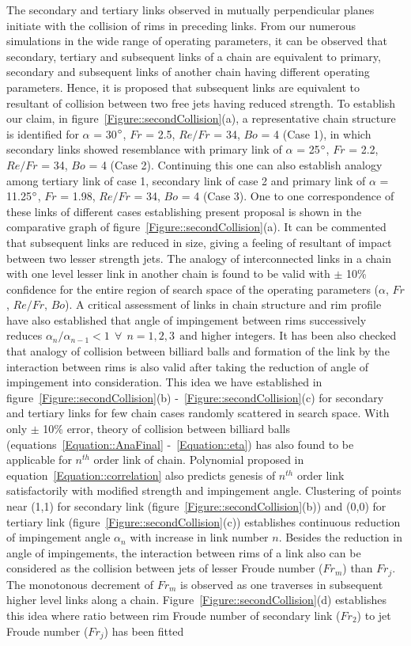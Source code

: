 \documentclass{jfm}
\begin{document}
The secondary and tertiary links observed in mutually perpendicular planes initiate with the collision of rims in preceding links. From our numerous simulations in the wide range of operating parameters, it can be observed that secondary, tertiary and subsequent links of a chain are equivalent to primary, secondary and subsequent links of another chain having different operating parameters. Hence, it is proposed that subsequent links are equivalent to resultant of collision between two free jets having reduced strength. To establish our claim, in figure~\ref{Figure::secondCollision}(a), a representative chain structure is identified for $\alpha$ = 30$\degree$, $Fr$ = 2.5, $Re/Fr$ = 34, $Bo$ = 4 (Case 1), in which secondary links showed resemblance with primary link of $\alpha$ = 25$\degree$, $Fr$ = 2.2, $Re/Fr$ = 34, $Bo$ = 4 (Case 2). Continuing this one can also establish analogy among tertiary link of case 1, secondary link of case 2 and primary link of $\alpha$ = 11.25$\degree$, $Fr$ = 1.98, $Re/Fr$ = 34, $Bo$ = 4 (Case 3). One to one correspondence of these links of different cases establishing present proposal is shown in the comparative graph of figure~\ref{Figure::secondCollision}(a). It can be commented that subsequent links are reduced in size, giving a feeling of resultant of impact between two lesser strength jets. The analogy of interconnected links in a chain with one level lesser link in another chain is found to be valid with $\pm$ 10\% confidence for the entire region of search space of the operating parameters ($\alpha$, $Fr$, $Re/Fr$, $Bo$). A critical assessment of links in chain structure and rim profile have also established that angle of impingement between rims successively reduces $\alpha_{n}/\alpha_{n-1} < 1 \:\:\forall\:\: n = 1, 2, 3 \:\:\text{and higher integers}$. It has been also checked that analogy of collision between billiard balls and formation of the link by the interaction between rims is also valid after taking the reduction of angle of impingement into consideration. This idea we have established in figure~\ref{Figure::secondCollision}(b) -~\ref{Figure::secondCollision}(c) for secondary and tertiary links for few chain cases randomly scattered in search space. With only $\pm$ 10\% error, theory of collision between billiard balls (equations~\ref{Equation::AnaFinal} -~\ref{Equation::eta}) has also found to be applicable for $n^{th}$ order link of chain. Polynomial proposed in equation~\ref{Equation::correlation} also predicts genesis of $n^{th}$ order link satisfactorily with modified strength and impingement angle. Clustering of points near (1,1) for secondary link (figure~\ref{Figure::secondCollision}(b)) and (0,0) for tertiary link (figure~\ref{Figure::secondCollision}(c)) establishes continuous reduction of impingement angle $\alpha_{n}$ with increase in link number $n$. Besides the reduction in angle of impingements, the interaction between rims of a link also can be considered as the collision between jets of lesser Froude number ($Fr_m$) than $Fr_j$. The monotonous decrement of $Fr_m$ is observed as one traverses in subsequent higher level links along a chain. Figure~\ref{Figure::secondCollision}(d) establishes this idea where ratio between rim Froude number of secondary link ($Fr_2$) to jet Froude number ($Fr_j$) has been fitted 
\end{document}
